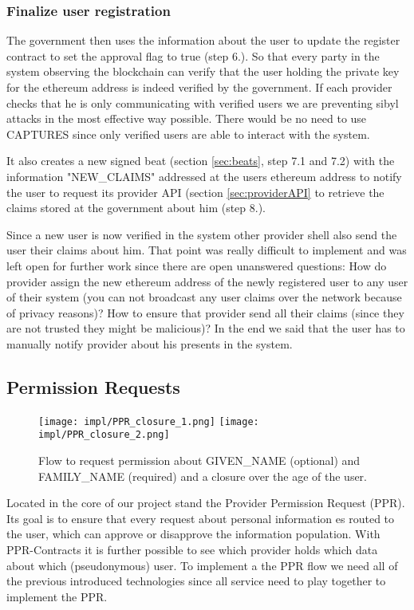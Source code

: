 \subsubsection{Finalize user registration}
The government then uses the information about the user to update the register contract to set the approval flag to true (step 6.). So that every party in the system observing the blockchain can verify that the user holding the private key for the ethereum address is indeed verified by the government. If each provider checks that he is only communicating with verified users we are preventing sibyl attacks in the most effective way possible. There would be no need to use CAPTURES since only verified users are able to interact with the system. 

It also creates a new signed beat (section \ref{sec:beats}, step 7.1 and 7.2) with the information "NEW\_CLAIMS" addressed at the users ethereum address to notify the user to request its provider API (section \ref{sec:providerAPI} to retrieve the claims stored at the government about him (step 8.). 

Since a new user is now verified in the system other provider shell also send the user their claims about him. That point was really difficult to implement and was left open for further work since there are open unanswered questions: How do provider assign the new ethereum address of the newly registered user to any user of their system (you can not broadcast any user claims over the network because of privacy reasons)? How to ensure that provider send all their claims (since they are not trusted they might be malicious)? 
In the end we said that the user has to manually notify provider about his presents in the system.

\subsection{Permission Requests}
\label{sec:ppr}

\begin{figure}
\texttt{[image: impl/PPR\_closure\_1.png]}
\texttt{[image: impl/PPR\_closure\_2.png]}
\centering
\caption{Flow to request permission about GIVEN\_NAME (optional) and FAMILY\_NAME (required) and a closure over the age of the user.}
\label{fig:ppr}
\end{figure}

Located in the core of our project stand the Provider Permission Request (PPR). Its goal is to ensure that every request about personal information es routed to the user, which can approve or disapprove the information population. With PPR-Contracts it is further possible to see which provider holds which data about which (pseudonymous) user. To implement a the PPR flow we need all of the previous introduced technologies since all service need to play together to implement the PPR. 

